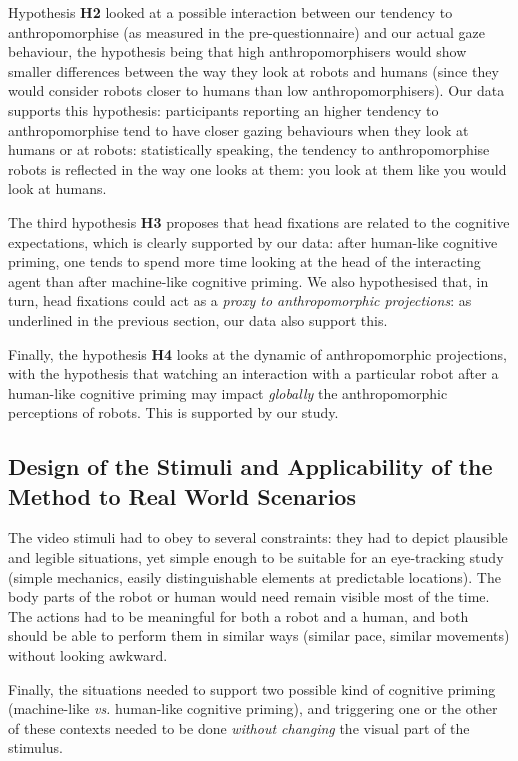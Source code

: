 \documentclass[lettersize, noapacite, twoside, HRI]{apa_HRI}
\newcommand{\vs}{\textit{vs.}\xspace}
\newcommand{\h}[1]{\textbf{H#1}\xspace}
\begin{document}
Hypothesis \h{2} looked at a possible interaction between our tendency to
anthropomorphise (as measured in the pre-questionnaire) and our actual gaze
behaviour, the hypothesis being that high anthropomorphisers would show smaller
differences between the way they look at robots and humans (since they would
consider robots closer to humans than low anthropomorphisers). Our data supports
this hypothesis: participants reporting an higher tendency to anthropomorphise
tend to have closer gazing behaviours when they look at humans or at robots:
statistically speaking, the tendency to anthropomorphise robots
is reflected in the way one looks at them: you look at them
like you would look at humans.

The third hypothesis \h{3} proposes that head fixations are related to the
cognitive expectations, which is clearly supported by our data: after human-like cognitive
priming, one tends to spend more time looking at the head of the interacting
agent than after machine-like cognitive priming. We also hypothesised that, in turn,
head fixations could act as a \emph{proxy to anthropomorphic projections}: as
underlined in the previous section, our data also support this.

Finally, the hypothesis \h{4} looks at the dynamic of anthropomorphic
projections, with the hypothesis that watching an interaction with a particular
robot after a human-like cognitive priming may impact \emph{globally} the
anthropomorphic perceptions of robots. This is supported by our study.

\subsection{Design of the Stimuli and Applicability of the Method to Real World
Scenarios}
\label{stimuli_design}

The video stimuli had to obey to several constraints: they had to depict
plausible and legible situations, yet simple enough to be suitable for an
eye-tracking study (simple mechanics, easily distinguishable elements at
predictable locations). The body parts of the robot or human would need remain
visible most of the time. The actions had to be meaningful for both a robot and
a human, and both should be able to perform them in similar ways (similar pace,
similar movements) without looking awkward.

Finally, the situations needed to support two possible kind of cognitive priming
(machine-like \vs human-like cognitive priming), and triggering one or the other of these
contexts needed to be done \emph{without changing} the visual part of the
stimulus.
\end{document}
